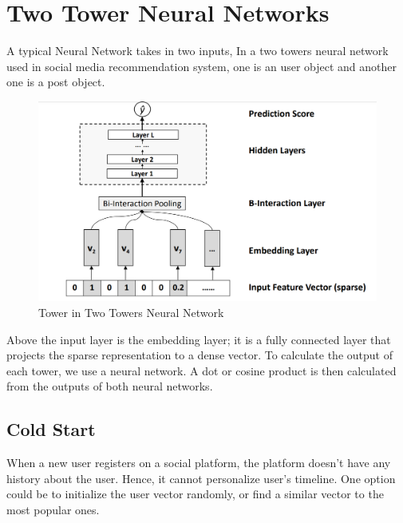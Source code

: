 \section{Two Tower Neural Networks} \label{nn}
A typical Neural Network takes in two inputs, In a two towers neural network used in social media recommendation system, one is an user object and another one is a post object.

\begin{figure}[H]
    \centering
    \includegraphics[width=1\linewidth]{Images/single-tower.png}
    \caption{Tower in Two Towers Neural Network \cite{10.1145/3038912.3052569}}
    \label{fig:collaborative-filtering-diagram}
\end{figure}

Above the input layer is the embedding layer; it is a fully
connected layer that projects the sparse representation to
a dense vector.  \cite{10.1145/3038912.3052569} \cite{DBLP:journals/corr/abs-1708-05027} To calculate the output of each tower, we use a neural network. A dot or cosine product is then calculated from the outputs of both neural networks.

\subsection{Cold Start}\label{cold-start}

When a new user registers on a social platform, the platform doesn't have any history about the user. Hence, it cannot personalize user's timeline. One option could be to initialize the user vector randomly, or find a similar vector to the most popular ones.

